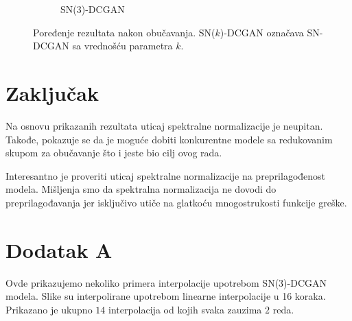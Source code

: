 \documentclass[12pt, a4paper]{article}
\begin{document}
\begin{figure}[H]
\begin{subfigure}[b]{0.475\textwidth}
		\caption[]%
		{{\small SN(3)-DCGAN}}    
		\label{fig:mean and std of net44}
	\end{subfigure}
	\caption[]
	{\small Poređenje rezultata nakon obučavanja. SN($k$)-DCGAN označava SN-DCGAN sa vrednošću parametra $k$.} 
	\label{fig:comparison}
\end{figure}

\section{Zaključak}
Na osnovu prikazanih rezultata uticaj spektralne normalizacije je neupitan. Takođe, pokazuje se da je moguće dobiti konkurentne modele sa redukovanim skupom za obučavanje što i jeste bio cilj ovog rada.

Interesantno je proveriti uticaj spektralne normalizacije na preprilagođenost modela. Mišljenja smo da spektralna normalizacija ne dovodi do preprilagođavanja jer isključivo utiče na glatkoću mnogostrukosti funkcije greške.

\section*{Dodatak A}
Ovde prikazujemo nekoliko primera interpolacije upotrebom SN($3$)-DCGAN modela. Slike su interpolirane upotrebom linearne interpolacije u 16 koraka. Prikazano je ukupno $14$ interpolacija od kojih svaka zauzima $2$ reda.
\end{document}
